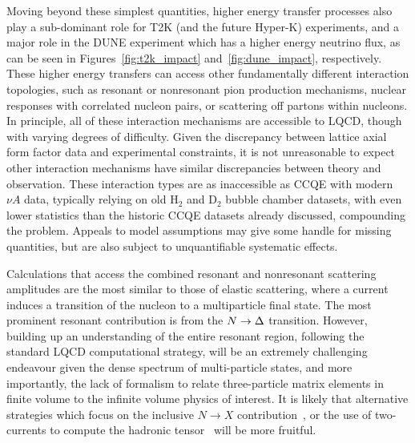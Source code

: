 Moving beyond these simplest quantities, higher energy transfer processes also play a sub-dominant role for T2K (and the future
Hyper-K) experiments, and a major role in the DUNE experiment which has a higher energy neutrino
flux, as can be seen in Figures~\ref{fig:t2k_impact} and~\ref{fig:dune_impact}, respectively.
These higher energy transfers can access other fundamentally different interaction topologies,
 such as resonant or nonresonant pion production mechanisms,
 nuclear responses with correlated nucleon pairs,
 or scattering off partons within nucleons.
In principle, all of these interaction mechanisms are accessible to LQCD,
 though with varying degrees of difficulty.
Given the discrepancy between lattice axial form factor data and experimental constraints,
 it is not unreasonable to expect other interaction mechanisms have similar discrepancies
 between theory and observation.
These interaction types are as inaccessible as CCQE with modern $\nu A$ data, typically relying on old H$_2$ and D$_2$ bubble chamber datasets, with even lower statistics than the historic CCQE datasets already discussed, compounding the problem.
Appeals to model assumptions may give some handle for missing quantities,
 but are also subject to unquantifiable systematic effects.

Calculations that access the combined resonant and nonresonant scattering amplitudes
 are the most similar to those of elastic scattering,
 where a current induces a transition of the nucleon to a multiparticle final state.
The most prominent resonant contribution is from the $N\rightarrow\Delta$ transition.
However, building up an understanding of the entire resonant region, following the standard LQCD computational strategy, will be an extremely challenging endeavour given the dense spectrum of multi-particle states, and more importantly, the lack of formalism to relate three-particle matrix elements in finite volume to the infinite volume physics of interest.
It is likely that alternative strategies which focus on the inclusive $N\rightarrow X$ contribution~\cite{Hansen:2017mnd,Gambino:2020crt,Fukaya:2020wpp,Bruno:2020kyl}, or the use of two-currents to compute the hadronic tensor~\cite{Liu:1993cv,Liang:2019frk} will be more fruitful.


